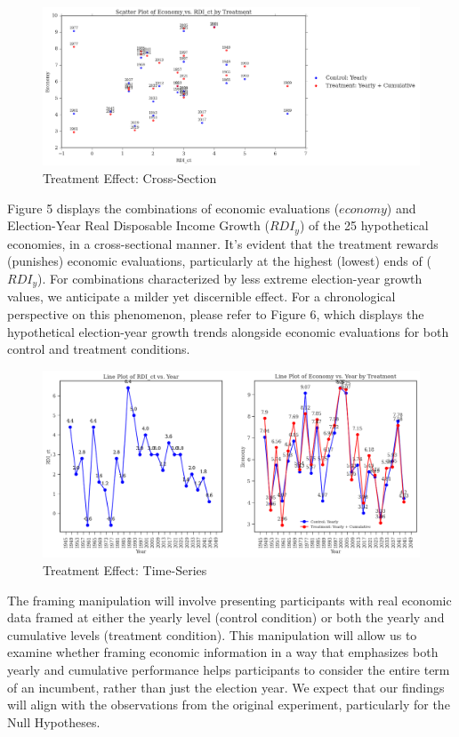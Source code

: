 \documentclass[
]{article}
\begin{document}
\begin{figure}
\hypertarget{fig:label}{%
\centering
\includegraphics[width=1\textwidth,height=1\textheight]{difcuma.png}
\caption{Treatment Effect: Cross-Section}\label{fig:label}
}
\end{figure}

Figure 5 displays the combinations of economic evaluations (\(economy\))
and Election-Year Real Disposable Income Growth (\(RDI_y\)) of the 25
hypothetical economies, in a cross-sectional manner. It's evident that
the treatment rewards (punishes) economic evaluations, particularly at
the highest (lowest) ends of (\(RDI_y\)). For combinations characterized
by less extreme election-year growth values, we anticipate a milder yet
discernible effect. For a chronological perspective on this phenomenon,
please refer to Figure 6, which displays the hypothetical election-year
growth trends alongside economic evaluations for both control and
treatment conditions.

\begin{figure}
\hypertarget{fig:label}{%
\centering
\includegraphics[width=1\textwidth,height=1\textheight]{difcum2.png}
\caption{Treatment Effect: Time-Series}\label{fig:label}
}
\end{figure}

The framing manipulation will involve presenting participants with real
economic data framed at either the yearly level (control condition) or
both the yearly and cumulative levels (treatment condition). This
manipulation will allow us to examine whether framing economic
information in a way that emphasizes both yearly and cumulative
performance helps participants to consider the entire term of an
incumbent, rather than just the election year. We expect that our
findings will align with the observations from the original experiment,
particularly for the Null Hypotheses.
\end{document}
